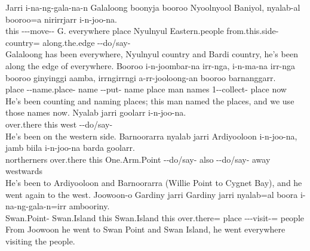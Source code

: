 \setcounter{exxy}{0}\begin{exye}
\exy {}
\gll Jarri i-na-ng-gala-na-n Galaloong boonyja booroo Nyoolnyool Baniyol, nyalab-al booroo=a nirirrjarr i-n-joo-na.\\
this ---move-- G. everywhere place Nyulnyul Eastern.people from.this.side- country= along.the.edge --do/say-\\
\ft Galaloong has been everywhere, Nyulnyul country and Bardi country, he's been along the edge of everywhere.
\exy {}
\gll Booroo i-n-joombar-na irr-nga, i-n-ma-na irr-nga booroo ginyinggi aamba, irrngirrngi a-rr-jooloong-an booroo barnanggarr.\\
place --name.place- name --put- name place  man names 1--collect- place now\\
\ft He's been counting and naming places; this man named the places, and we use those names now.
\exy {}
\gll Nyalab jarri goolarr i-n-joo-na.\\
over.there this west --do/say-\\
\ft He's been on the western side.
\newpage\exy {}
\gll Barnoorarra nyalab jarri Ardiyooloon i-n-joo-na, jamb biila i-n-joo-na barda goolarr.\\
northerners over.there this One.Arm.Point --do/say-  also --do/say- away westwards\\
\ft He's been to Ardiyooloon and Barnoorarra (Willie Point to Cygnet Bay), and he went again to the west.
\exy {}
\gll Joowoon-o Gardiny jarri Gardiny jarri nyalab=al boora i-na-ng-gala-n=irr ambooriny.\\
Swan.Point- Swan.Island this Swan.Island this over.there= place ---visit-= people\\
\ft From Joowoon he went to Swan Point and Swan Island, he went everywhere visiting the people.

\end{exye}
